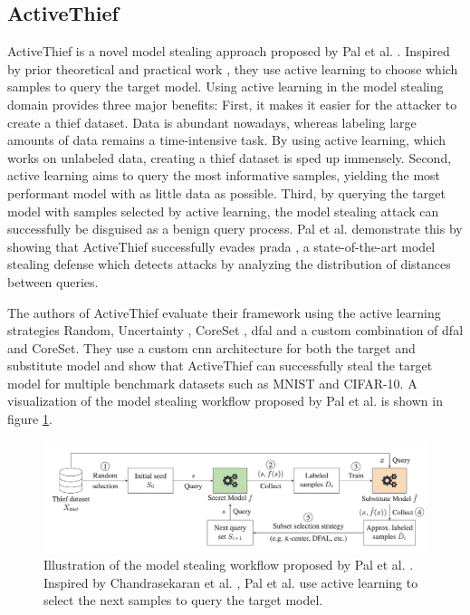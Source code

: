 \subsection{ActiveThief}
\label{sec:Related_work:Model_Stealing:ActiveThief}
ActiveThief is a novel model stealing approach proposed by Pal et al. \cite{pal2020activethief}. Inspired by prior theoretical \cite{chandrasekaran2020exploring}
and practical work \cite{shi2018active}, they use active learning to choose which samples to query the target model. Using active learning in the model stealing
domain provides three major benefits: First, it makes it easier for the attacker to create a thief dataset. Data is abundant nowadays, whereas labeling large amounts
of data remains a time-intensive task. By using active learning, which works on unlabeled data, creating a thief dataset is sped up immensely.
Second, active learning aims to query the most informative samples, yielding the most performant model with as little data as possible. Third, by querying the target model
with samples selected by active learning, the model stealing attack can successfully be disguised as a benign query process. Pal et al. demonstrate this by showing 
that ActiveThief successfully evades \gls{prada} \cite{juuti2019prada}, a state-of-the-art model stealing defense which detects attacks by analyzing the distribution of distances
between queries. \par
The authors of ActiveThief evaluate their framework using the active learning strategies Random, Uncertainty \cite{lewis1995sequential}, CoreSet \cite{sener2017active},
\gls{dfal}\cite{ducoffe2018adversarial} and a custom combination of \gls{dfal} and CoreSet. They use a custom \gls{cnn} architecture
for both the target and substitute model and show that ActiveThief can successfully steal the target model for multiple benchmark datasets such as MNIST and CIFAR-10.
A visualization of the model stealing workflow proposed by Pal et al. is shown in figure \ref{fig:ActiveThief}.

\begin{figure} [ht]
    \centering
    \includegraphics[width=.9\linewidth]{images/ActiveThief_Idea.png}
    \caption[Visualization of ActiveThief]{Illustration of the model stealing workflow proposed by Pal et al. \cite{pal2020activethief}. Inspired by
    Chandrasekaran et al. \cite{chandrasekaran2020exploring}, Pal et al. use active learning to select the next samples to query the target model.}
    \label{fig:ActiveThief}
\end{figure}

